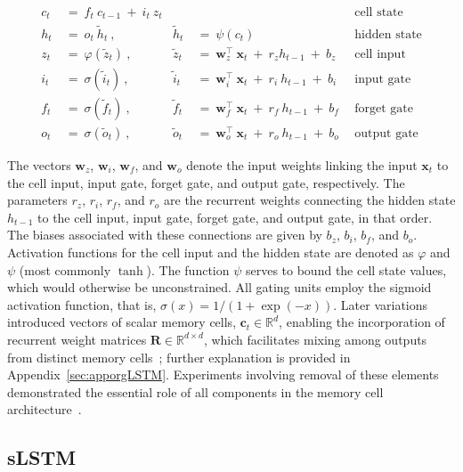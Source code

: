 \begin{align}
c_t \ &= \  f_t \ c_{t-1} \ + \ i_t \ z_t &  & &\text{cell state} \\
h_t  \ &= \ o_t \ \tilde{h}_t \ , & \tilde{h}_t \ &= \ \psi \left( c_t\right)
  &\text{hidden state} \\
z_t \ &= \ \varphi \left( \tilde{z}_t \right) \ , 
  &\tilde{z}_t \ &=  \ \mathbf{w}^\top_{z} \ \mathbf{x}_t \ + \
  r_{z}  h_{t-1} \ + \  b_{z} \ \
  &\text{cell input} \\
i_t \ &= \ \sigma \left( \tilde{i}_t  \right) \ , 
  &\tilde{i}_t \ &= \ \mathbf{w}^\top_{i} \ \mathbf{x}_t \ + \
  r_{i}  \ h_{t-1} \ + \  b_{i} \ \
  &\text{input gate} \\
f_t \ &= \ \sigma \left(  \tilde{f}_t \right) \ , 
  &\tilde{f}_t \ &= \ \mathbf{w}^\top_{f} \ \mathbf{x}_t  \ + \
  r_{f}  \ h_{t-1} \ + \  b_{f} \ \
  &\text{forget gate} \\
o_t \ &= \ \sigma \left( \tilde{o}_t \right) \ , 
  &\tilde{o}_t  \ &= \ \mathbf{w}^\top_{o} \ \mathbf{x}_t \ + \
  r_{o}  \ h_{t-1} \ + \  b_{o} \ \
  &\text{output gate} 
\end{align}

The vectors $\mathbf{w}_{z}$, $\mathbf{w}_{i}$, $\mathbf{w}_{f}$, and $\mathbf{w}_{o}$ denote the input weights linking the input $\mathbf{x}_t$ to the cell input, input gate, forget gate, and output gate, respectively. The parameters $r_{z}$, $r_{i}$, $r_{f}$, and $r_{o}$ are the recurrent weights connecting the hidden state $h_{t-1}$ to the cell input, input gate, forget gate, and output gate, in that order. The biases associated with these connections are given by $b_{z}$, $b_{i}$, $b_{f}$, and $b_{o}$. Activation functions for the cell input and the hidden state are denoted as $\varphi$ and $\psi$ (most commonly $\tanh$). The function $\psi$ serves to bound the cell state values, which would otherwise be unconstrained. All gating units employ the sigmoid activation function, that is, $\sigma \left( x \right) = 1/(1+\exp(-x))$. Later variations introduced vectors of scalar memory cells, $\mathbf{c}_t \in \mathbb{R}^{d}$, enabling the incorporation of recurrent weight matrices $\mathbf{R} \in \mathbb{R}^{d \times d}$, which facilitates mixing among outputs from distinct memory cells~\citep{Greff:15}; further explanation is provided in Appendix~\ref{sec:apporgLSTM}. Experiments involving removal of these elements demonstrated the essential role of all components in the memory cell architecture~\citep{Greff:15}.

\subsection{sLSTM}
\label{sec:sLSTM}

